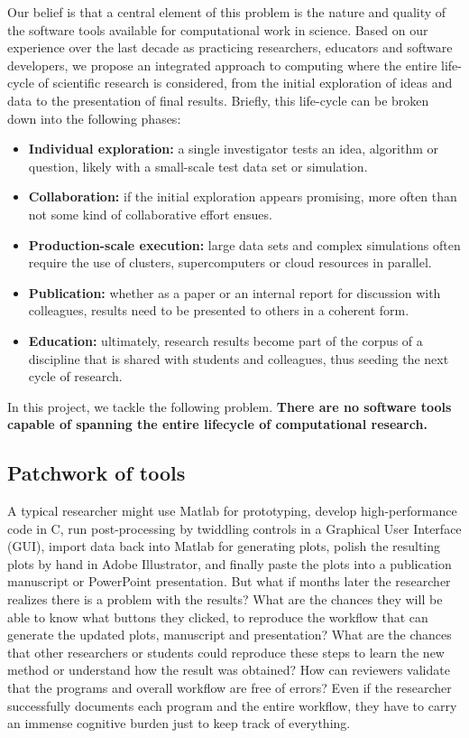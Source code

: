 \documentclass[ChapterTOCs,krantz2]{krantz} %
\begin{document}
Our belief is that a central element
of this problem is the nature and quality of the software tools available
for computational work in science. Based on our experience over the
last decade as practicing researchers, educators and software developers,
we propose an integrated approach to computing where the entire life-cycle
of scientific research is considered, from the initial exploration
of ideas and data to the presentation of final results. Briefly, this
life-cycle can be broken down into the following phases:
\begin{itemize}
\item \textbf{Individual exploration:} a single investigator tests an idea,
algorithm or question, likely with a small-scale test data set or
simulation.
\item \textbf{Collaboration:} if the initial exploration appears promising,
more often than not some kind of collaborative effort ensues.
\item \textbf{Production-scale execution:} large data sets and complex simulations
often require the use of clusters, supercomputers or cloud resources
in parallel.
\item \textbf{Publication:} whether as a paper or an internal report for
discussion with colleagues, results need to be presented to others
in a coherent form.
\item \textbf{Education:} ultimately, research results become part of the
corpus of a discipline that is shared with students and colleagues,
thus seeding the next cycle of research.
\end{itemize}
In this project, we tackle the following problem.\textbf{ There are
no software tools capable of spanning the entire lifecycle of computational
research.}

\subsection{Patchwork of tools}

A typical researcher might use Matlab
for prototyping, develop high-performance code in C, run post-processing
by twiddling controls in a Graphical User Interface (GUI), import
data back into Matlab for generating plots, polish the resulting plots
by hand in Adobe Illustrator, and finally paste the plots into a publication
manuscript or PowerPoint presentation. But what if months later the
researcher realizes there is a problem with the results? What are
the chances they will be able to know what buttons they clicked, to
reproduce the workflow that can generate the updated plots, manuscript
and presentation? What are the chances that other researchers or students
could reproduce these steps to learn the new method or understand
how the result was obtained? How can reviewers validate that the programs
and overall workflow are free of errors? Even if the researcher successfully
documents each program and the entire workflow, they have to carry
an immense cognitive burden just to keep track of everything.
\end{document}
